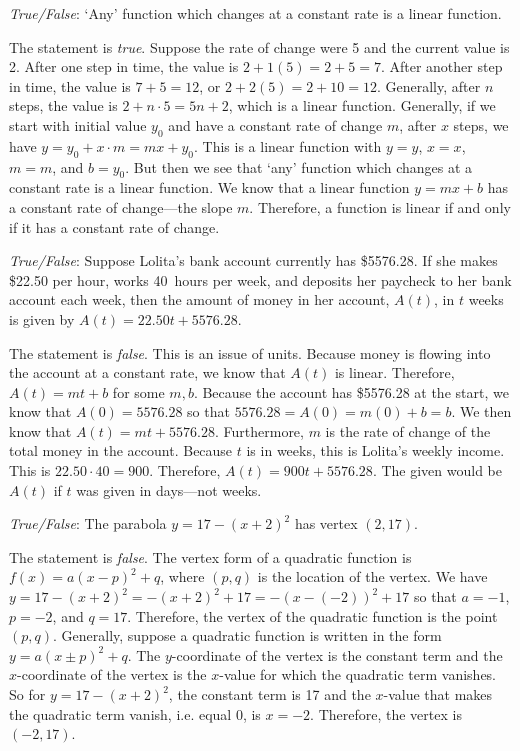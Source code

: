 \documentclass[11pt,letterpaper]{article}
\begin{document}
\quizsol \textit{True/False}: `Any' function which changes at a constant rate is a linear function. \pspace

\sol The statement is \textit{true}. Suppose the rate of change were 5 and the current value is 2. After one step in time, the value is $2 + 1(5)= 2 + 5= 7$. After another step in time, the value is $7 + 5= 12$, or $2 + 2(5)= 2 + 10= 12$. Generally, after $n$ steps, the value is $2 + n \cdot 5= 5n + 2$, which is a linear function. Generally, if we start with initial value $y_0$ and have a constant rate of change $m$, after $x$ steps, we have $y= y_0 + x \cdot m= mx + y_0$. This is a linear function with $y= y$, $x= x$, $m= m$, and $b= y_0$. But then we see that `any' function which changes at a constant rate is a linear function. We know that a linear function $y= mx + b$ has a constant rate of change---the slope $m$. Therefore, a function is linear if and only if it has a constant rate of change. 



\newpage



\quizsol \textit{True/False}: Suppose Lolita's bank account currently has \$5576.28. If she makes \$22.50 per hour, works 40~hours per week, and deposits her paycheck to her bank account each week, then the amount of money in her account, $A(t)$, in $t$ weeks is given by $A(t)= 22.50t + 5576.28$. \pspace

\sol The statement is \textit{false}. This is an issue of units. Because money is flowing into the account at a constant rate, we know that $A(t)$ is linear. Therefore, $A(t)= mt + b$ for some $m, b$. Because the account has \$5576.28 at the start, we know that $A(0)= 5576.28$ so that $5576.28= A(0)= m(0) + b= b$. We then know that $A(t)= mt + 5576.28$. Furthermore, $m$ is the rate of change of the total money in the account. Because $t$ is in weeks, this is Lolita's weekly income. This is $22.50 \cdot 40= 900$. Therefore, $A(t)= 900t + 5576.28$. The given would be $A(t)$ if $t$ was given in days---not weeks. \pvspace{1.3cm}



\quizsol \textit{True/False}: The parabola $y= 17 - (x + 2)^2$ has vertex $(2, 17)$. \pspace

\sol The statement is \textit{false}. The vertex form of a quadratic function is $f(x)= a(x - p)^2 + q$, where $(p, q)$ is the location of the vertex. We have $y= 17 - (x + 2)^2= -(x + 2)^2 + 17= -(x - (-2))^2 + 17$ so that $a= -1$, $p= -2$, and $q= 17$. Therefore, the vertex of the quadratic function is the point $(p, q)$. Generally, suppose a quadratic function is written in the form $y= a(x \pm p)^2 + q$. The $y$-coordinate of the vertex is the constant term and the $x$-coordinate of the vertex is the $x$-value for which the quadratic term vanishes. So for $y= 17 - (x+ 2)^2$, the constant term is 17 and the $x$-value that makes the quadratic term vanish, i.e. equal 0, is $x= -2$. Therefore, the vertex is $(-2, 17)$. \pvspace{1.3cm}
\end{document}
